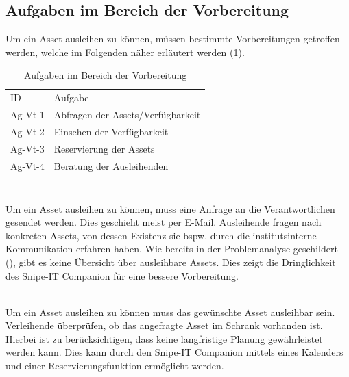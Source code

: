 \subsection{Aufgaben im Bereich der Vorbereitung}
Um ein Asset ausleihen zu können, müssen bestimmte Vorbereitungen getroffen werden, welche im
Folgenden näher erläutert werden (\ref{table:Ag-Vt}).

\begin{table}[h]
        \centering
        \caption{Aufgaben im Bereich der Vorbereitung}
        \begin{tabular}{ll}
                \arrayrulecolor{maincolor}\hline
                \sffamily\color{maincolor}ID & \sffamily\color{maincolor}Aufgabe \\
                \arrayrulecolor{maincolor}\hline
                Ag-Vt-1                      & Abfragen der Assets/Verfügbarkeit    \\
                Ag-Vt-2                       & Einsehen der Verfügbarkeit        \\
                Ag-Vt-3                      & Reservierung der Assets           \\
                Ag-Vt-4                      & Beratung der Ausleihenden         \\
                \arrayrulecolor{maincolor}\hline
        \end{tabular}
        \label{table:Ag-Vt}
\end{table}

{\sffamily\color{maincolor}{Ag-Vt-1 | Abfragen der Assets/Verfügbarkeit}}\\
Um ein Asset ausleihen zu können, muss eine Anfrage an die Verantwortlichen gesendet werden. Dies
geschieht meist per E-Mail. Ausleihende fragen nach konkreten Assets, von dessen Existenz sie bspw.
durch die institutsinterne Kommunikation erfahren haben. Wie bereits in der Problemanalyse
geschildert (), gibt es keine Übersicht über ausleihbare Assets.
Dies zeigt die Dringlichkeit des Snipe-IT Companion für eine bessere Vorbereitung.

        {\sffamily\color{maincolor}{Ag-Vt-2 | Einsehen der Verfügbarkeit}}\\
Um ein Asset ausleihen zu können muss das gewünschte Asset ausleihbar sein. Verleihende überprüfen,
ob das angefragte Asset im Schrank vorhanden ist. Hierbei ist zu berücksichtigen, dass keine
langfristige Planung gewährleistet werden kann. Dies kann durch den Snipe-IT Companion mittels eines
Kalenders und einer Reservierungsfunktion ermöglicht werden.

